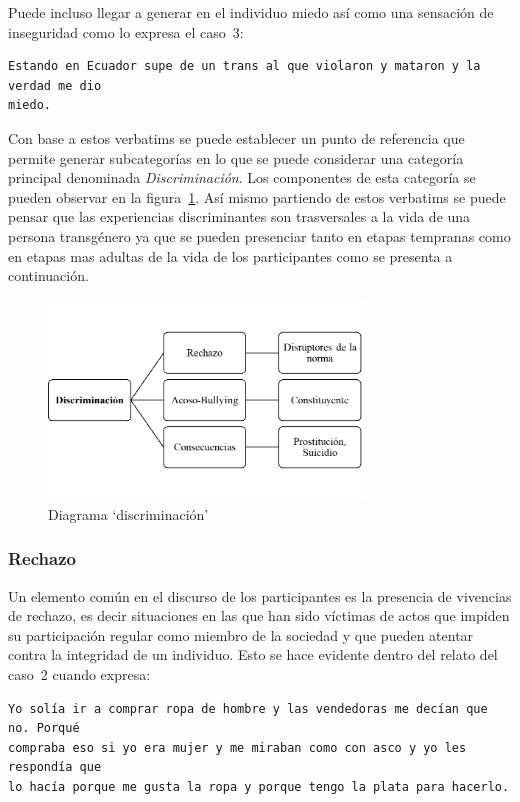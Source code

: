  Puede incluso llegar a generar en el individuo miedo así como una sensación de
 inseguridad como lo expresa el caso~3:

 \begin{verbatim}
Estando en Ecuador supe de un trans al que violaron y mataron y la verdad me dio
miedo.
 \end{verbatim}

Con base a estos verbatims se puede establecer un punto de referencia que
permite generar subcategorías en lo que se puede considerar una categoría
principal denominada \emph{Discriminación}. Los componentes de esta categoría se
pueden observar en la figura~\ref{fig:discriminacion}. Así mismo partiendo de
estos verbatims se puede pensar que las experiencias discriminantes son
trasversales a la vida de una persona transgénero ya que se pueden presenciar
tanto en etapas tempranas como en etapas mas adultas de la vida de los
participantes como se presenta a continuación.

\begin{figure}
    \centering
    \includegraphics[width=0.75\textwidth]{discriminacion}
    \caption{Diagrama ‘discriminación’}\label{fig:discriminacion}
\end{figure}

\subsubsection{Rechazo}

Un elemento común en el discurso de los participantes es la presencia de
vivencias de rechazo, es decir situaciones en las que han sido víctimas de actos
que impiden su participación regular como miembro de la sociedad y que pueden
atentar contra la integridad de un individuo. Esto se hace evidente dentro del
relato del caso~2 cuando expresa:

\begin{verbatim}
Yo solía ir a comprar ropa de hombre y las vendedoras me decían que no. Porqué
compraba eso si yo era mujer y me miraban como con asco y yo les respondía que
lo hacía porque me gusta la ropa y porque tengo la plata para hacerlo.
\end{verbatim}

